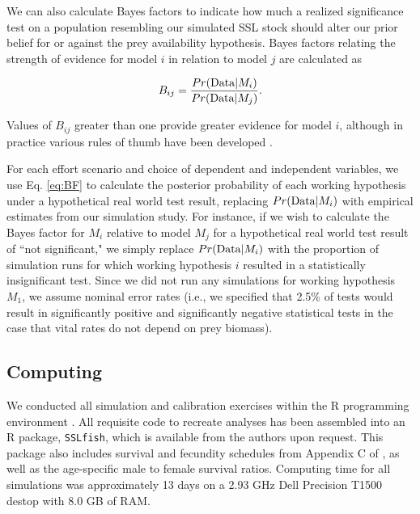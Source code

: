 \documentclass[nonumbib,leqno]{nrc1}
\begin{document}
We can also calculate Bayes factors \citep{Jeffreys1935,KassRaftery1995} to indicate how much a realized significance test on a population resembling our simulated SSL stock should alter our prior belief for or against the prey availability hypothesis.  Bayes factors relating the strength of evidence for model $i$ in relation to model $j$ are calculated as
\begin{linenomath}
  \begin{equation}
     \label{eq:BF}
     B_{ij}=\frac{Pr({\rm Data} | M_i)}{Pr({\rm Data} | M_j)}.
  \end{equation}
\end{linenomath}
Values of $B_{ij}$ greater than one provide greater evidence for model $i$, although in practice various rules of thumb have been developed \citep[e.g., that values of $B_{ij}$ between 1/3 and 3 provide little evidence with which to distinguish performance of models $i$ and $j$;][]{KassRaftery1995}.


For each effort scenario and choice of dependent and independent variables, we use Eq. \ref{eq:BF} to calculate the posterior probability of each working hypothesis under a hypothetical real world test result, replacing $Pr({\rm Data}|M_i)$ with empirical estimates from our simulation study.  For instance, if we wish to calculate the Bayes factor for $M_i$ relative to model $M_j$ for a hypothetical real world test result of ``not significant," we simply replace $Pr({\rm Data}|M_i)$ with the proportion of simulation runs for which working hypothesis $i$ resulted in a statistically insignificant test.  Since we did not run any simulations for working hypothesis $M_1$, we assume nominal error rates (i.e., we specified that 2.5\% of tests would result in significantly positive and significantly negative statistical tests in the case that vital rates do not depend on prey biomass).

\subsection{Computing}

We conducted all simulation and calibration exercises within the R programming environment \citep{RTeam2012}.  All requisite code to recreate analyses has been assembled into an R package, \texttt{SSLfish}, which is available from the authors upon request.  This package also includes survival and fecundity schedules from Appendix C of \citet{HolmesEtAl2007}, as well as the age-specific male to female survival ratios. Computing time for all simulations was approximately 13 days on a 2.93 GHz Dell Precision T1500 destop with 8.0 GB of RAM.
\end{document}
